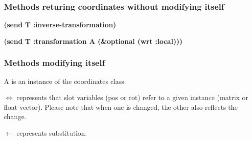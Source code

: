 \subsubsection*{Methods returing coordinates without modifying itself}

\begin{refdesc}

{\bf (send T :inverse-transformation)}

{\bf (send T :transformation A (\&optional (wrt :local)))}

\end{refdesc}

\subsubsection*{Methods modifying itself}

A is an instance of the coordinates class.

$\Leftrightarrow$ represents that
slot variables (pos or rot) refer to a given instance (matrix or float vector).
Please note that when one is changed, the other also reflects the change.

$\leftarrow$ represents substitution.


